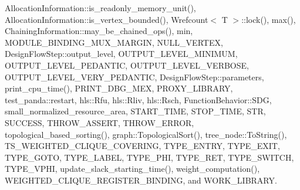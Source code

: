 Allocation\+Information\+::is\+\_\+readonly\+\_\+memory\+\_\+unit(), Allocation\+Information\+::is\+\_\+vertex\+\_\+bounded(), Wrefcount$<$ T $>$\+::lock(), max(), Chaining\+Information\+::may\+\_\+be\+\_\+chained\+\_\+ops(), min, M\+O\+D\+U\+L\+E\+\_\+\+B\+I\+N\+D\+I\+N\+G\+\_\+\+M\+U\+X\+\_\+\+M\+A\+R\+G\+IN, N\+U\+L\+L\+\_\+\+V\+E\+R\+T\+EX, Design\+Flow\+Step\+::output\+\_\+level, O\+U\+T\+P\+U\+T\+\_\+\+L\+E\+V\+E\+L\+\_\+\+M\+I\+N\+I\+M\+UM, O\+U\+T\+P\+U\+T\+\_\+\+L\+E\+V\+E\+L\+\_\+\+P\+E\+D\+A\+N\+T\+IC, O\+U\+T\+P\+U\+T\+\_\+\+L\+E\+V\+E\+L\+\_\+\+V\+E\+R\+B\+O\+SE, O\+U\+T\+P\+U\+T\+\_\+\+L\+E\+V\+E\+L\+\_\+\+V\+E\+R\+Y\+\_\+\+P\+E\+D\+A\+N\+T\+IC, Design\+Flow\+Step\+::parameters, print\+\_\+cpu\+\_\+time(), P\+R\+I\+N\+T\+\_\+\+D\+B\+G\+\_\+\+M\+EX, P\+R\+O\+X\+Y\+\_\+\+L\+I\+B\+R\+A\+RY, test\+\_\+panda\+::restart, hls\+::\+Rfu, hls\+::\+Rliv, hls\+::\+Rsch, Function\+Behavior\+::\+S\+DG, small\+\_\+normalized\+\_\+resource\+\_\+area, S\+T\+A\+R\+T\+\_\+\+T\+I\+ME, S\+T\+O\+P\+\_\+\+T\+I\+ME, S\+TR, S\+U\+C\+C\+E\+SS, T\+H\+R\+O\+W\+\_\+\+A\+S\+S\+E\+RT, T\+H\+R\+O\+W\+\_\+\+E\+R\+R\+OR, topological\+\_\+based\+\_\+sorting(), graph\+::\+Topological\+Sort(), tree\+\_\+node\+::\+To\+String(), T\+S\+\_\+\+W\+E\+I\+G\+H\+T\+E\+D\+\_\+\+C\+L\+I\+Q\+U\+E\+\_\+\+C\+O\+V\+E\+R\+I\+NG, T\+Y\+P\+E\+\_\+\+E\+N\+T\+RY, T\+Y\+P\+E\+\_\+\+E\+X\+IT, T\+Y\+P\+E\+\_\+\+G\+O\+TO, T\+Y\+P\+E\+\_\+\+L\+A\+B\+EL, T\+Y\+P\+E\+\_\+\+P\+HI, T\+Y\+P\+E\+\_\+\+R\+ET, T\+Y\+P\+E\+\_\+\+S\+W\+I\+T\+CH, T\+Y\+P\+E\+\_\+\+V\+P\+HI, update\+\_\+slack\+\_\+starting\+\_\+time(), weight\+\_\+computation(), W\+E\+I\+G\+H\+T\+E\+D\+\_\+\+C\+L\+I\+Q\+U\+E\+\_\+\+R\+E\+G\+I\+S\+T\+E\+R\+\_\+\+B\+I\+N\+D\+I\+NG, and W\+O\+R\+K\+\_\+\+L\+I\+B\+R\+A\+RY.

